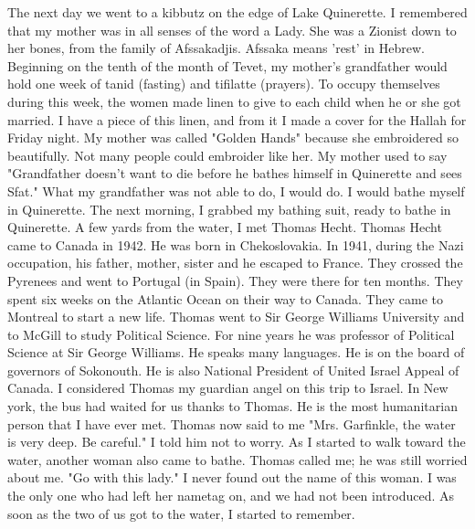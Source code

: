 The next day we went to a kibbutz on the edge of Lake Quinerette. I remembered that my mother was in all senses of the word a Lady. She was a Zionist down to her bones, from the family of Afssakadjis. Afssaka means 'rest' in Hebrew. Beginning on the tenth of the month of Tevet, my 
mother's grandfather would hold one week of tanid (fasting) and tifilatte (prayers). To occupy themselves during this week, the women made linen 
to give to each child when he or she got married. I have a piece of this 
linen, and from it I made a cover for the Hallah for Friday night. My mother 
was called "Golden Hands" because she embroidered so beautifully. Not 
many people could embroider like her. My mother used to say "Grandfather 
doesn't want to die before he bathes himself in Quinerette and sees Sfat." 
What my grandfather was not able to do, I would do. I would bathe myself in Quinerette. 
The next morning, I grabbed my bathing suit, ready to bathe in Quinerette. A few yards from the water, I met Thomas Hecht. Thomas Hecht came to Canada in 1942. He was born in Chekoslovakia. In 1941, during the Nazi occupation, his father, mother, sister and he escaped to France. They crossed the Pyrenees and went to Portugal (in Spain). They were 
there for ten months. They spent six weeks on the Atlantic Ocean on their way to Canada. They came to Montreal to start a new life. Thomas went to Sir George Williams University and to McGill to study Political Science. 
For nine years he was professor of Political Science at Sir George Williams. He speaks many languages. He is on the board of governors of Sokonouth. He is also National President of United Israel Appeal of Canada. I considered Thomas my guardian angel on this trip to Israel. In 
New york, the bus had waited for us thanks to Thomas. He is the most 
humanitarian person that I have ever met. 
Thomas now said to me "Mrs. Garfinkle, the water is very deep. Be 
careful." I told him not to worry. As I started to walk toward the water, 
another woman also came to bathe. Thomas called me; he was still worried 
about me. "Go with this lady." I never found out the name of this woman. I was the only one who had left her nametag on, and we had not been introduced. As soon as the two of us got to the water, I started to remember. 

